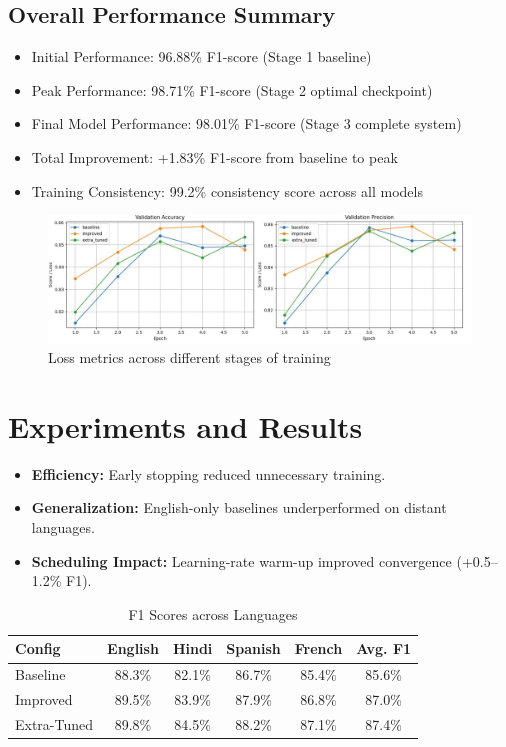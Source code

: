 \documentclass{ecai}
\begin{document}
\subsection{Overall Performance Summary}
\begin{itemize}
    \item Initial Performance: 96.88\% F1-score (Stage 1 baseline)
    \item Peak Performance: 98.71\% F1-score (Stage 2 optimal checkpoint)
    \item Final Model Performance: 98.01\% F1-score (Stage 3 complete system)
    \item Total Improvement: +1.83\% F1-score from baseline to peak
    \item Training Consistency: 99.2\% consistency score across all models
\end{itemize}

\begin{figure}[H]
    \centering
    \includegraphics[width=\linewidth]{training_matrices_3.jpeg}
    \caption{Loss metrics across different stages of training}
    \label{fig:loss_metrics}
\end{figure}

\section{Experiments and Results}
\begin{itemize}
    \item \textbf{Efficiency:} Early stopping reduced unnecessary training.
    \item \textbf{Generalization:} English-only baselines underperformed on distant languages.
    \item \textbf{Scheduling Impact:} Learning-rate warm-up improved convergence (+0.5–1.2\% F1).
\end{itemize}

\begin{table}[H]
\centering
\caption{F1 Scores across Languages}
\begin{tabular}{lcccc|c}
\toprule
Config        & English & Hindi & Spanish & French & Avg. F1 \\
\midrule
Baseline      & 88.3\%  & 82.1\% & 86.7\%  & 85.4\% & 85.6\%  \\
Improved      & 89.5\%  & 83.9\% & 87.9\%  & 86.8\% & 87.0\%  \\
Extra-Tuned   & 89.8\%  & 84.5\% & 88.2\%  & 87.1\% & 87.4\%  \\
\bottomrule
\end{tabular}
\end{table}
\end{document}
